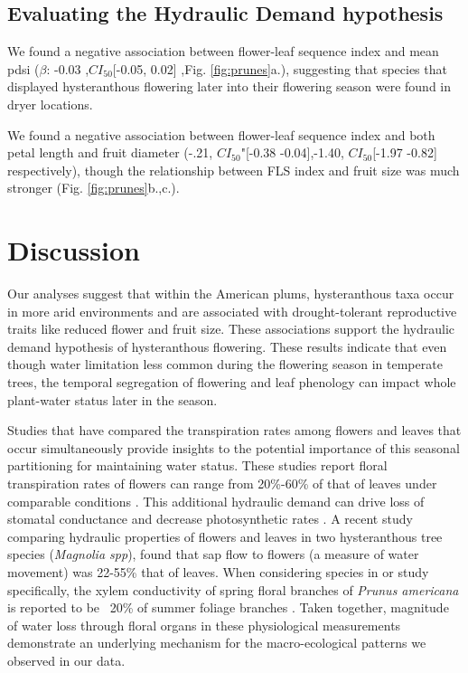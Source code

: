 \documentclass{article}[11pt]
\begin{document}
\subsection*{Evaluating the Hydraulic Demand hypothesis}
We found a negative association between flower-leaf sequence index and mean pdsi ($\beta$: -0.03 ,$CI_{50}$[-0.05,  0.02] ,Fig. \ref{fig:prunes}a.), suggesting that species that displayed hysteranthous flowering later into their flowering season were found in dryer locations. 

We found a negative association between flower-leaf sequence index and both  petal length and fruit diameter (-.21, $CI_{50}$"[-0.38 -0.04],-1.40, $CI_{50}$[-1.97 -0.82] respectively), though the relationship between FLS index and fruit size was much stronger (Fig. \ref{fig:prunes}b.,c.).

\section*{Discussion}

Our analyses suggest that within the American plums, hysteranthous taxa occur in more arid environments and are associated with drought-tolerant reproductive traits like reduced flower and fruit size. These associations support the hydraulic demand hypothesis of hysteranthous flowering. These results indicate that even though water limitation less common during the flowering season in temperate trees, the temporal segregation of flowering and leaf phenology can impact whole plant-water status later in the season.

Studies that have compared the transpiration rates among flowers and leaves that occur simultaneously provide insights to the potential importance of this seasonal partitioning for maintaining water status. These studies report floral transpiration rates of flowers can range from 20\%-60\% of that of leaves under comparable conditions \citep{Whiley:1988uf,Roddy:2012wn}. This additional hydraulic demand can drive loss of stomatal conductance and  decrease photosynthetic rates \citep{Galen:1999vr}. A recent study \citet{Liu:2017wg} comparing hydraulic properties of flowers and leaves in two hysteranthous tree species (\textit{Magnolia spp}), found that sap flow to flowers (a measure of water movement) was 22-55\% that of leaves. When considering species in or study specifically, the xylem conductivity of spring floral branches of \textit{Prunus americana} is reported to be ~20\% of summer foliage branches \citep{McMann:2022ww}. Taken together, magnitude of water loss through floral organs in these physiological measurements demonstrate an underlying mechanism for the macro-ecological patterns we observed in our data.
\end{document}
